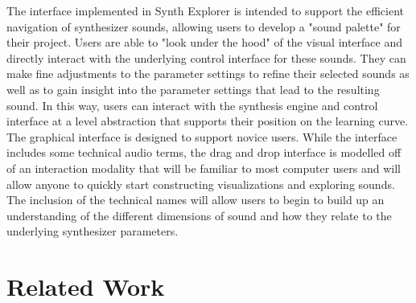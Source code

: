 The interface implemented in Synth Explorer is intended to support the efficient navigation of synthesizer sounds, allowing users to develop a "sound palette" for their project. Users are able to "look under the hood" of the visual interface and directly interact with the underlying control interface for these sounds. They can make fine adjustments to the parameter settings to refine their selected sounds as well as to gain insight into the parameter settings that lead to the resulting sound. In this way, users can interact with the synthesis engine and control interface at a level abstraction that supports their position on the learning curve. The graphical interface is designed to support novice users. While the interface includes some technical audio terms, the drag and drop interface is modelled off of an interaction modality that will be familiar to most computer users and will allow anyone to quickly start constructing visualizations and exploring sounds. The inclusion of the technical names will allow users to begin to build up an understanding of the different dimensions of sound and how they relate to the underlying synthesizer parameters.

\section{Related Work}

